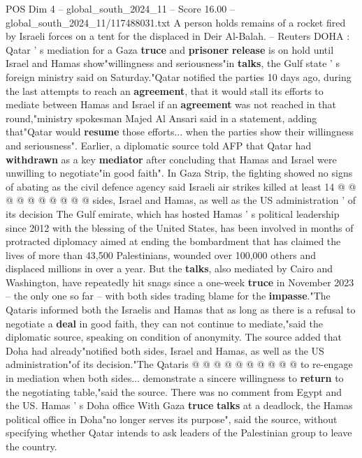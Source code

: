 \begin{textsample}{POS Dim 4 – global\_south\_2024\_11 – Score 16.00 – global\_south\_2024\_11/117488031.txt}  \label{ex:f4_pos_257}
A person holds remains of a rocket fired by Israeli forces on a tent for the displaced in Deir Al-Balah. -- Reuters DOHA : Qatar ' s mediation for a Gaza \textbf{truce} and \textbf{prisoner} \textbf{release} is on hold until Israel and Hamas show"willingness and seriousness"in \textbf{talks}, the Gulf state ' s foreign ministry said on Saturday."Qatar notified the parties 10 days ago, during the last attempts to reach an \textbf{agreement}, that it would stall its efforts to mediate between Hamas and Israel if an \textbf{agreement} was not reached in that round,"ministry spokesman Majed Al Ansari said in a statement, adding that"Qatar would \textbf{resume} those efforts... when the parties show their willingness and seriousness".
Earlier, a diplomatic source told AFP that Qatar had \textbf{withdrawn} as a key \textbf{mediator} after concluding that Hamas and Israel were unwilling to negotiate"in good faith".
In Gaza Strip, the fighting showed no signs of abating as the civil defence agency said Israeli air strikes killed at least 14 @ @ @ @ @ @ @ @ @ @ sides, Israel and Hamas, as well as the US administration ' of its decision The Gulf emirate, which has hosted Hamas ' s political leadership since 2012 with the blessing of the United States, has been involved in months of protracted diplomacy aimed at ending the bombardment that has claimed the lives of more than 43,500 Palestinians, wounded over 100,000 others and displaced millions in over a year.
But the \textbf{talks}, also mediated by Cairo and Washington, have repeatedly hit snags since a one-week \textbf{truce} in November 2023 -- the only one so far -- with both sides trading blame for the \textbf{impasse}."The Qataris informed both the Israelis and Hamas that as long as there is a refusal to negotiate a \textbf{deal} in good faith, they can not continue to mediate,"said the diplomatic source, speaking on condition of anonymity.
The source added that Doha had already"notified both sides, Israel and Hamas, as well as the US administration"of its decision."The Qataris @ @ @ @ @ @ @ @ @ @ to re-engage in mediation when both sides... demonstrate a sincere willingness to \textbf{return} to the negotiating table,"said the source.
There was no comment from Egypt and the US.
Hamas ' s Doha office With Gaza \textbf{truce} \textbf{talks} at a deadlock, the Hamas political office in Doha"no longer serves its purpose", said the source, without specifying whether Qatar intends to ask leaders of the Palestinian group to leave the country.

\end{textsample}
